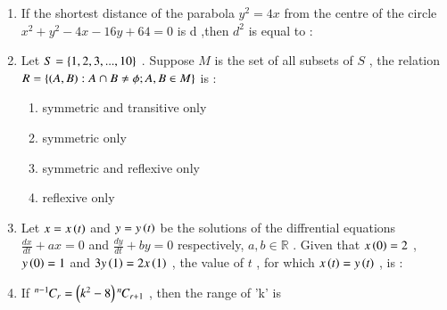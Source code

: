 \documentclass[journal,12pt,onecolumn]{IEEEtran}
\theoremstyle{remark}
\begin{document}
\begin{enumerate}
\item If the shortest distance of the parabola $ y^2=4x $ from the centre of the circle $ x^2+y^2-4x-16y+64=0 $ is d ,then $ d^2 $ is equal to : \\
\begin{enumerate}   
\end{enumerate}
\item Let $S=\left\{1,2,3,...,10\right\}$  . Suppose $ M $ is the set of all subsets of $ S $ , the relation $R=\left\{ (A,B):A \cap B \neq \phi ;A,B \in M \right\}$ is : \\
\begin{enumerate}
\item symmetric and transitive only 
\item symmetric only 
\item symmetric and reflexive only 
\item reflexive only 
\end{enumerate}
\item Let $x=x\left(t\right)$ and $y=y\left(t\right)$ be the solutions of the diffrential equations $\frac{dx}{dt}+ax=0$ and $\frac{dy}{dt}+by=0$ respectively, $a,b \in \mathbb{R}$ . Given that $x\left(0\right)=2$ , $y\left(0\right)=1$ and $3y\left(1\right)=2x\left(1\right)$ , the value of $t$ , for which $x\left(t\right)=y\left(t\right)$ , is :  \\
\begin{enumerate}   
\end{enumerate}
\item If ${{}^{n-1}\mkern-1muC_{r}} = \left(k^2 - 8\right){{}^{n}\mkern-1muC_{r+1}}$ , then the range of 'k' is \\
\begin{enumerate}
\end{enumerate}
\end{enumerate}
\end{document}

